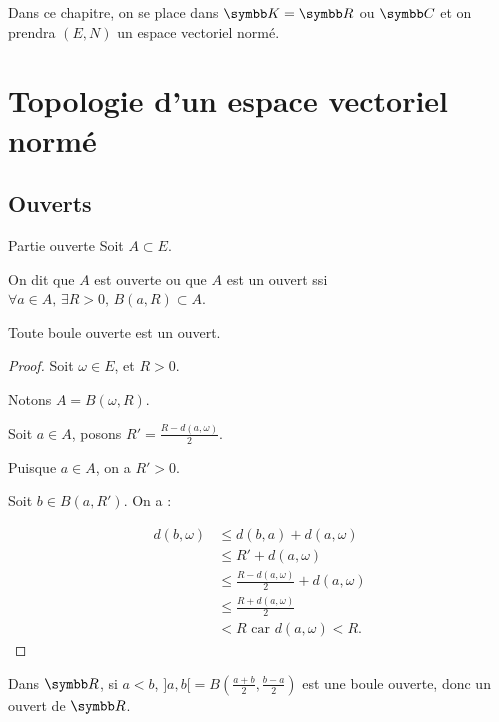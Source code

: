 Dans ce chapitre, on se place dans $\K = \R$ ou $\C$ et on prendra $(E, N)$ un espace vectoriel normé.

\section{Topologie d'un espace vectoriel normé}
\subsection{Ouverts}

\begin{definition}{Partie ouverte}{}
    Soit $A \subset E$.

    On dit que $A$ est ouverte ou que $A$ est un ouvert ssi 
    $\forall a \in A, \, \exists R > 0, \, B(a, R) \subset A$.
\end{definition}

\begin{proposition}{}{}
    Toute boule ouverte est un ouvert.
\end{proposition}


\begin{proof}
    Soit $\omega \in E$, et $R > 0$. 

    Notons $A = B(\omega, R)$.

    Soit $a \in A$, posons $R' = \frac{R - d(a, \omega)}{2}$. 

    Puisque $a \in A$, on a $R' > 0$.

    Soit $b \in B(a, R')$. On a : 

    \begin{align*}
        d(b, \omega) & \leqslant d(b, a) + d(a, \omega) \\
        & \leqslant R' + d(a, \omega) \\
        & \leqslant \frac{R - d(a, \omega)}{2 } + d(a, \omega) \\
        & \leqslant \frac{R + d(a, \omega)}{2} \\
        & < R \text{ car } d(a, \omega) < R.
    \end{align*}
\end{proof}

\begin{exemple}
    Dans $\R$, si $a < b$, $]a, b[ = B\left(\frac{a+b}{2}, \frac{b-a}{2}\right)$ est une boule 
    ouverte, donc un ouvert de $\R$.
\end{exemple}

